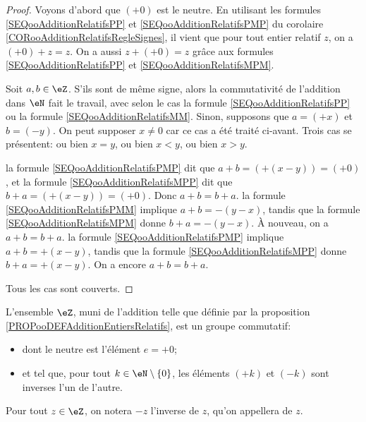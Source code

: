 \begin{proof}
	Voyons d'abord que \( (+0) \) est le neutre. En utilisant les formules \ref{SEQooAdditionRelatifsPP} et \ref{SEQooAdditionRelatifsPMP} du corolaire \ref{CORooAdditionRelatifsRegleSignes}, il vient que pour tout entier relatif \( z \), on a \( (+0) + z = z \). On a aussi \( z + (+0) = z \) grâce aux formules \ref{SEQooAdditionRelatifsPP} et \ref{SEQooAdditionRelatifsMPM}.
 
	Soit \( a, b \in \eZ \). S'ils sont de même signe, alors la commutativité de l'addition dans \( \eN \) fait le travail, avec selon le cas la formule \ref{SEQooAdditionRelatifsPP} ou la formule \ref{SEQooAdditionRelatifsMM}. Sinon, supposons que \( a = (+x) \) et \( b = (-y) \). On peut supposer \( x \neq 0 \) car ce cas a été traité ci-avant. Trois cas se présentent: ou bien \(  x = y \), ou bien \( x < y \), ou bien \( x > y \).
 	\begin{subproof}
  		\spitem[Si \( x = y\): ] la formule \ref{SEQooAdditionRelatifsPMP} dit que \( a + b = (+(x-y)) = (+0) \), et la formule \ref{SEQooAdditionRelatifsMPP} dit que \( b + a = (+(x-y)) = (+0) \). Donc \( a + b = b + a \).
  		\spitem[Si  \( x < y \):] la formule \ref{SEQooAdditionRelatifsPMM} implique \( a + b = -(y-x) \), tandis que la formule \ref{SEQooAdditionRelatifsMPM} donne \( b + a = -(y-x) \). À nouveau, on a  \( a + b = b + a \).
		\spitem[Si  \( x > y \):] la formule \ref{SEQooAdditionRelatifsPMP} implique \( a + b = +(x-y) \), tandis que la formule \ref{SEQooAdditionRelatifsMPP} donne \( b + a = +(x-y) \). On a encore \( a + b = b + a \).
  	\end{subproof}
   	Tous les cas sont couverts.
\end{proof}

\begin{propositionDef}	\label{PROPooGroupeEntiersRelatifs}
	L'ensemble \( \eZ \), muni de l'addition telle que définie par la proposition \ref{PROPooDEFAdditionEntiersRelatifs}, est un groupe commutatif:
 	\begin{itemize}
  		\item dont le neutre est l'élément \( e = +0 \);
		\item et tel que, pour tout \( k \in \eN \setminus \{ 0 \} \), les éléments \( (+k) \) et \( (-k) \) sont inverses l'un de l'autre.
  	\end{itemize}
    Pour tout \( z \in \eZ \), on notera \( -z \) l'inverse de \( z \), qu'on appellera  de \( z \).
\end{propositionDef}

